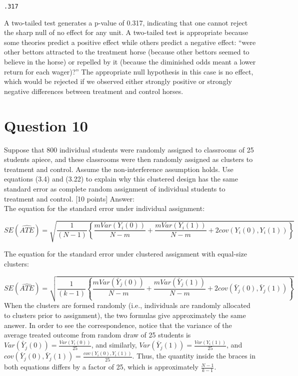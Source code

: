 \documentclass[11pt,notitlepage]{article}\usepackage[]{graphicx}\usepackage[]{color}
\makeatletter
\newenvironment{kframe}{%
 \def\at@end@of@kframe{}%
 \ifinner\ifhmode%
  \def\at@end@of@kframe{\end{minipage}}%
  \begin{minipage}{\columnwidth}%
 \fi\fi%
 \def\FrameCommand##1{\hskip\@totalleftmargin \hskip-\fboxsep
 \colorbox{shadecolor}{##1}\hskip-\fboxsep
     \hskip-\linewidth \hskip-\@totalleftmargin \hskip\columnwidth}%
 \MakeFramed {\advance\hsize-\width
   \@totalleftmargin\z@ \linewidth\hsize
   \@setminipage}}%
 {\par\unskip\endMakeFramed%
 \at@end@of@kframe}
\newenvironment{knitrout}{}{} %
\makeatother
\begin{document}
\begin{enumerate}[a)]
\begin{knitrout}
\begin{kframe}
    \begin{Verbatim}[commandchars=\\\{\}]
.317

    \end{Verbatim}

\end{kframe}
\end{knitrout}
A two-tailed test generates a p-value of 0.317, indicating that one cannot reject the sharp null of no effect for any unit. A two-tailed test is appropriate because some theories predict a positive effect while others predict a negative effect: ``were other bettors attracted to the treatment horse (because other bettors seemed to believe in the horse) or repelled by it (because the diminished odds meant a lower return for each wager)?''  The appropriate null hypothesis in this case is no effect, which would be rejected if we observed either strongly positive or strongly negative differences between treatment and control horses.
\end{enumerate}

\section*{Question 10}
Suppose that 800 individual students were randomly assigned to classrooms of 25 students apiece, and these classrooms were then randomly assigned as clusters to treatment and control. Assume the non-interference assumption holds. Use equations (3.4) and (3.22) to explain why this clustered design has the same standard error as complete random assignment of individual students to treatment and control. [10 points]
Answer:\\

The equation for the standard error under individual assignment:

\begin{equation*}
SE(\widehat{ATE}) = \sqrt{\frac{1}{(N-1)} \left \{ \frac{mVar(Y_i (0))}{N- m} + \frac{mVar(Y_i (1))}{N- m} + 2cov(Y_i(0), Y_i(1))\right \}}
\end{equation*}

The equation for the standard error under clustered assignment with equal-size clusters:

\begin{equation*}
SE(\widehat{ATE}) = \sqrt{\frac{1}{(k-1)} \left \{ \frac{mVar(\bar{Y}_j (0))}{N- m} + \frac{mVar(\bar{Y}_j (1))}{N- m} + 2cov(\bar{Y}_j(0), \bar{Y}_j(1))\right \}}
\end{equation*}
When the clusters are formed randomly (i.e., individuals are randomly allocated to clusters prior to assignment), the two formulas give approximately the same answer. In order to see the correspondence, notice that the variance of the average treated outcome from random draw of 25 students is $Var(\bar{Y}_j(0)) = \frac{Var(Y_i (0))}{25}$, and similarly, $Var(\bar{Y}_j(1)) = \frac{Var(Y_i (1))}{25}$, and $cov(\bar{Y}_j(0), \bar{Y}_j(1)) = \frac{cov(Y_i(0), Y_i(1))}{25}$. Thus, the quantity inside the braces in both equations differs by a factor of 25, which is approximately $\frac{N-1}{k-1}$.
\end{document}
